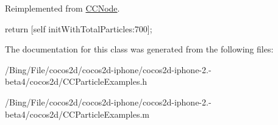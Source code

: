 Reimplemented from \hyperlink{class_c_c_node_ad789cad83aca65c130abd4452d1bc081}{C\-C\-Node}.


\begin{DoxyCode}
{
        return [self initWithTotalParticles:700];
}
\end{DoxyCode}


The documentation for this class was generated from the following files\-:\begin{DoxyCompactItemize}
\item 
/\-Bing/\-File/cocos2d/cocos2d-\/iphone/cocos2d-\/iphone-\/2.-\/beta4/cocos2d/C\-C\-Particle\-Examples.\-h\item 
/\-Bing/\-File/cocos2d/cocos2d-\/iphone/cocos2d-\/iphone-\/2.-\/beta4/cocos2d/C\-C\-Particle\-Examples.\-m\end{DoxyCompactItemize}
